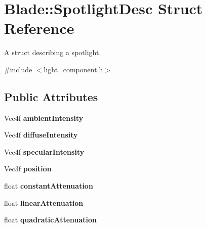 \hypertarget{struct_blade_1_1_spotlight_desc}{}\section{Blade\+:\+:Spotlight\+Desc Struct Reference}
\label{struct_blade_1_1_spotlight_desc}


A struct describing a spotlight.  




{\ttfamily \#include $<$light\+\_\+component.\+h$>$}

\subsection*{Public Attributes}
\begin{DoxyCompactItemize}
\item 
\mbox{\label{struct_blade_1_1_spotlight_desc_a2041764fd3648c785a1a16368ea85c8b}} 
Vec4f {\bfseries ambient\+Intensity}
\item 
\mbox{\label{struct_blade_1_1_spotlight_desc_a324c3d9fe5bf9f09d7209f8adf77aaeb}} 
Vec4f {\bfseries diffuse\+Intensity}
\item 
\mbox{\label{struct_blade_1_1_spotlight_desc_aaefce9673a244c135ddc453c8d0e9143}} 
Vec4f {\bfseries specular\+Intensity}
\item 
\mbox{\label{struct_blade_1_1_spotlight_desc_a5ed2fbaf76bc698f3e59a940e959bdb6}} 
Vec3f {\bfseries position}
\item 
\mbox{\label{struct_blade_1_1_spotlight_desc_add43527538000bbb1b2283840d2e6e19}} 
float {\bfseries constant\+Attenuation}
\item 
\mbox{\label{struct_blade_1_1_spotlight_desc_aa186429377fee71f2a59d66724d31185}} 
float {\bfseries linear\+Attenuation}
\item 
\mbox{\label{struct_blade_1_1_spotlight_desc_a4ff16c531daec16d237aa60abc9b231f}} 
float {\bfseries quadratic\+Attenuation}
\item 

\end{DoxyCompactItemize}
